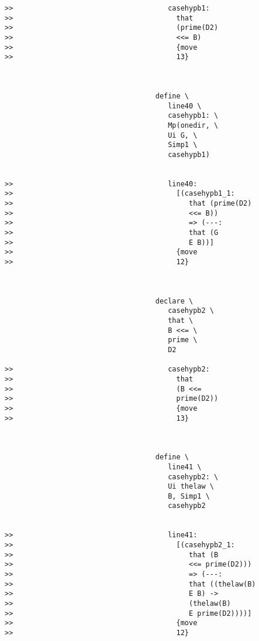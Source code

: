 \documentclass[12pt]{article}
\begin{document}
\begin{verbatim}
>>                                     casehypb1:
>>                                       that
>>                                       (prime(D2)
>>                                       <<= B)
>>                                       {move
>>                                       13}



                                    define \
                                       line40 \
                                       casehypb1: \
                                       Mp(onedir, \
                                       Ui G, \
                                       Simp1 \
                                       casehypb1)


>>                                     line40:
>>                                       [(casehypb1_1:
>>                                          that (prime(D2)
>>                                          <<= B))
>>                                          => (---:
>>                                          that (G
>>                                          E B))]
>>                                       {move
>>                                       12}



                                    declare \
                                       casehypb2 \
                                       that \
                                       B <<= \
                                       prime \
                                       D2

>>                                     casehypb2:
>>                                       that
>>                                       (B <<=
>>                                       prime(D2))
>>                                       {move
>>                                       13}



                                    define \
                                       line41 \
                                       casehypb2: \
                                       Ui thelaw \
                                       B, Simp1 \
                                       casehypb2


>>                                     line41:
>>                                       [(casehypb2_1:
>>                                          that (B
>>                                          <<= prime(D2)))
>>                                          => (---:
>>                                          that ((thelaw(B)
>>                                          E B) ->
>>                                          (thelaw(B)
>>                                          E prime(D2))))]
>>                                       {move
>>                                       12}




\end{verbatim}
\end{document}
